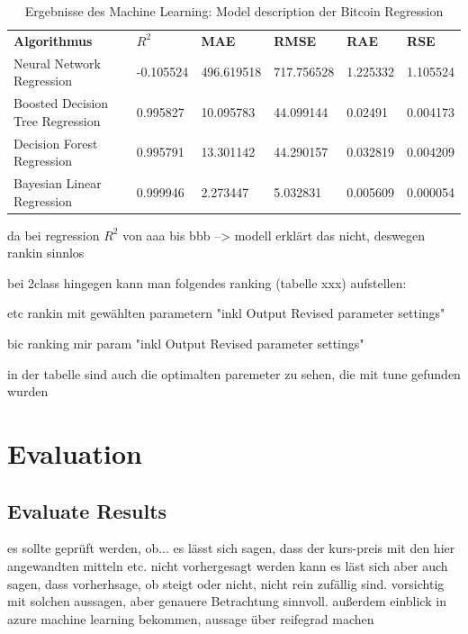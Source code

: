 \begin{table}[H]
\centering
\begin{tabular}{|p{4cm}|p{}|p{}|p{}|p{}|p{}|}
\hline
\textbf{Algorithmus} & \textbf{$ R^2 $} & \textbf{MAE} & \textbf{RMSE} & \textbf{RAE} & \textbf{RSE}\\ 
\hhline{======}
Neural Network Regression & -0.105524 & 496.619518 & 717.756528 & 1.225332 & 1.105524 \\ \hline
Boosted Decision Tree Regression & 0.995827 & 10.095783 & 44.099144 & 0.02491 & 0.004173 \\ \hline
Decision Forest Regression & 0.995791 & 13.301142 & 44.290157 & 0.032819 & 0.004209 \\ \hline
Bayesian Linear Regression & 0.999946 & 2.273447 & 5.032831 & 0.005609 & 0.000054 \\ \hline
\end{tabular}
\caption{Ergebnisse des Machine Learning: Model description der Bitcoin Regression}
\end{table}




da bei regression $ R^2 $ von aaa bis bbb --> modell erklärt das nicht, deswegen rankin sinnlos

bei 2class hingegen kann man folgendes ranking (tabelle xxx) aufstellen:



etc rankin mit gewählten parametern "inkl Output Revised parameter settings"

bic ranking mir param "inkl Output Revised parameter settings"



in der tabelle sind auch die optimalten paremeter zu sehen, die mit tune gefunden wurden








\section{Evaluation}
\subsection{Evaluate Results}
es sollte geprüft werden, ob...
es lässt sich sagen, dass der kurs-preis mit den hier angewandten mitteln etc. nicht vorhergesagt werden kann
es läst sich aber auch sagen, dass vorherhsage, ob steigt oder nicht, nicht rein zufällig sind. vorsichtig mit solchen aussagen, aber genauere Betrachtung sinnvoll.
außerdem einblick in azure machine learning bekommen, aussage über reifegrad machen

